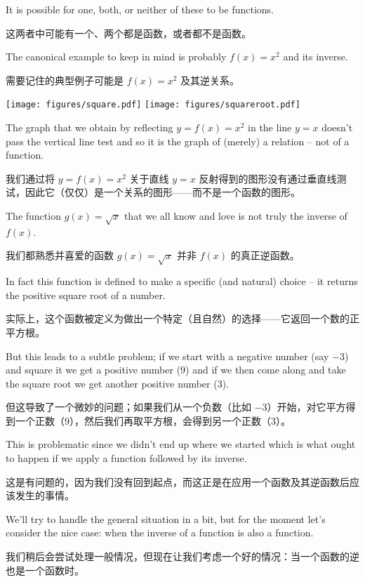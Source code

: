 It is possible for one, both,
or neither of these to be functions.

这两者中可能有一个、两个都是函数，或者都不是函数。

The canonical example to keep
in mind is probably $f(x) = x^2$ and its inverse.

需要记住的典型例子可能是 $f(x) = x^2$ 及其逆关系。

\begin{center}
\texttt{[image: figures/square.pdf]} \hspace{.5in} \texttt{[image: figures/squareroot.pdf]}
\end{center}

The graph that we obtain by reflecting $y=f(x)=x^2$ in the line $y=x$ doesn't
pass the vertical line test and so it is the graph of (merely) a relation 
-- not of a function.

我们通过将 $y=f(x)=x^2$ 关于直线 $y=x$ 反射得到的图形没有通过垂直线测试，因此它（仅仅）是一个关系的图形——而不是一个函数的图形。

The function $g(x) = \sqrt{x}$ that we all know 
and love is not truly the inverse of $f(x)$.

我们都熟悉并喜爱的函数 $g(x) = \sqrt{x}$ 并非 $f(x)$ 的真正逆函数。

In fact this function is
defined to make a specific (and natural) choice -- it returns the positive
square root of a number.

实际上，这个函数被定义为做出一个特定（且自然）的选择——它返回一个数的正平方根。

But this leads to a subtle problem; if we start
with a negative number (say $-3$) and square it we get a positive number ($9$)
and if we then come along and take the square root we get another positive
number ($3$).

但这导致了一个微妙的问题；如果我们从一个负数（比如 $-3$）开始，对它平方得到一个正数（$9$），然后我们再取平方根，会得到另一个正数（$3$）。

This is problematic since we didn't end up where we started
which is what ought to happen if we apply a function followed by its inverse.

这是有问题的，因为我们没有回到起点，而这正是在应用一个函数及其逆函数后应该发生的事情。

We'll try to handle the general situation in a bit, but for the moment let's
consider the nice case: when the inverse of a function is also a function.

我们稍后会尝试处理一般情况，但现在让我们考虑一个好的情况：当一个函数的逆也是一个函数时。

